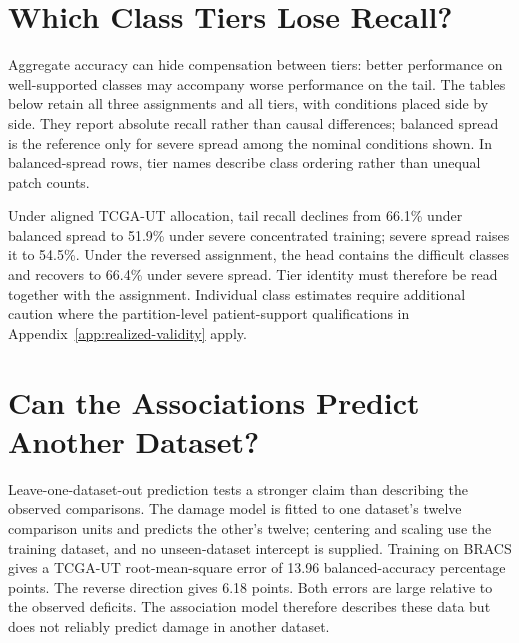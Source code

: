 \clearpage
\section{Which Class Tiers Lose Recall?}
\label{app:endpoints}
Aggregate accuracy can hide compensation between tiers: better performance on well-supported classes may accompany worse performance on the tail. The tables below retain all three assignments and all tiers, with conditions placed side by side. They report absolute recall rather than causal differences; balanced spread is the reference only for severe spread among the nominal conditions shown. In balanced-spread rows, tier names describe class ordering rather than unequal patch counts.

\begin{table}[H]
\centering\small

\caption{BRACS tier recall (\%). Aligned tail recall falls sharply even at moderate allocation, while head recall rises. The aggregate therefore combines losses and gains.}
\label{tab:tier-endpoints-detail}
\end{table}
\begin{table}[H]
\centering\small

\caption{TCGA-UT tier recall (\%). Moderate changes are smaller than on BRACS, but severe deprivation still damages the aligned tail.}
\label{tab:tier-tcga}
\end{table}

\noindent Under aligned TCGA-UT allocation, tail recall declines from 66.1\% under balanced spread to 51.9\% under severe concentrated training; severe spread raises it to 54.5\%. Under the reversed assignment, the head contains the difficult classes and recovers to 66.4\% under severe spread. Tier identity must therefore be read together with the assignment. Individual class estimates require additional caution where the partition-level patient-support qualifications in Appendix~\ref{app:realized-validity} apply.

\section{Can the Associations Predict Another Dataset?}
\label{app:rq3-prediction}
Leave-one-dataset-out prediction tests a stronger claim than describing the observed comparisons. The damage model is fitted to one dataset's twelve comparison units and predicts the other's twelve; centering and scaling use the training dataset, and no unseen-dataset intercept is supplied. Training on BRACS gives a TCGA-UT root-mean-square error of \num{13.96} balanced-accuracy percentage points. The reverse direction gives \num{6.18} points. Both errors are large relative to the observed deficits. The association model therefore describes these data but does not reliably predict damage in another dataset.

